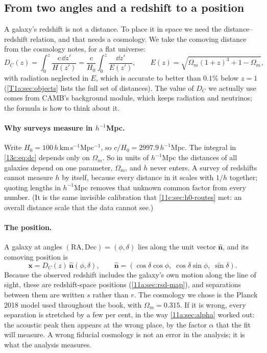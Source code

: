 \subsection{From two angles and a redshift to a position}
\label{13c:sec:positions}

A galaxy's redshift is not a distance. To place it in space we need the
distance--redshift relation, and that needs a cosmology. We take the comoving
distance from the cosmology notes, for a flat universe:
\begin{equation}
  D_C(z)=\int_0^z\frac{c\,\dd z'}{H(z')}
  =\frac{c}{H_0}\int_0^z\frac{\dd z'}{E(z')},\qquad
  E(z)=\sqrt{\Omega_m(1+z)^3+1-\Omega_m},
  \label{13c:eq:dc}
\end{equation}
with radiation neglected in $E$, which is accurate to better than $0.1\%$ below
$z=1$ (\cref{T1a:sec:objects} lists the full set of distances). The value of $D_C$
we actually use comes from CAMB's background module, which keeps radiation and
neutrinos; the formula is how to think about it.

\paragraph{Why surveys measure in $h^{-1}$Mpc.}
Write $H_0=100\,h$\,km\,s$^{-1}$Mpc$^{-1}$, so $c/H_0=2997.9\,h^{-1}$Mpc. The
integral in \eqref{13c:eq:dc} depends only on $\Omega_m$. So in units of
$h^{-1}$Mpc the distances of all galaxies depend on one parameter, $\Omega_m$,
and $h$ never enters. A survey of redshifts cannot measure $h$ by itself, because
every distance in it scales with $1/h$ together; quoting lengths in $h^{-1}$Mpc
removes that unknown common factor from every number. (It is the same invisible
calibration that \cref{11c:sec:h0-routes} met: an overall distance scale that the
data cannot see.)

\paragraph{The position.}
A galaxy at angles $(\mathrm{RA},\mathrm{Dec})=(\phi,\delta)$ lies along the unit
vector $\hat{\bm n}$, and its comoving position is
\begin{equation}
  \bm x=D_C(z)\,\hat{\bm n}(\phi,\delta),\qquad
  \hat{\bm n}=(\cos\delta\cos\phi,\;\cos\delta\sin\phi,\;\sin\delta).
  \label{13c:eq:position}
\end{equation}
Because the observed redshift includes the galaxy's own motion along the line of
sight, these are redshift-space positions (\cref{11a:sec:rsd-map}), and separations
between them are written $s$ rather than $r$. The cosmology we chose is the Planck
2018 model used throughout the book, with $\Omega_m=0.315$. If it is wrong, every
separation is stretched by a few per cent, in the way \cref{11a:sec:alpha} worked
out: the acoustic peak then appears at the wrong place, by the factor $\alpha$ that
the fit will measure. A wrong fiducial cosmology is not an error in the analysis;
it is what the analysis measures.

